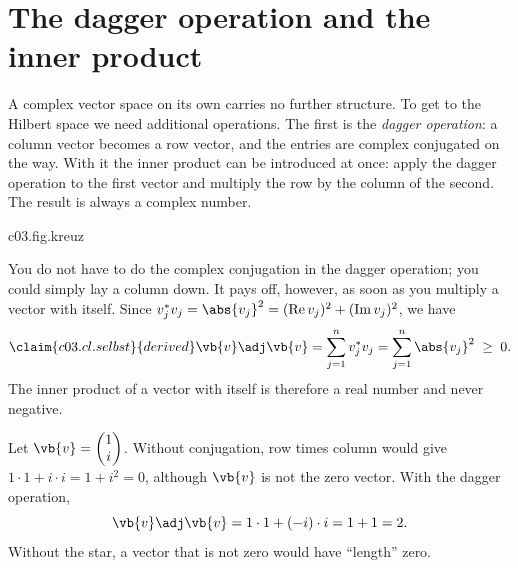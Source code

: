 \section{The dagger operation and the inner product}\label{c03.s2}

A complex vector space on its own carries no further structure. To get to the Hilbert space we
need additional operations. The first is the \emph{dagger operation}: a column vector becomes
a row vector, and the entries are complex conjugated on the way. With it the inner product can
be introduced at once: apply the dagger operation to the first vector and multiply the row by
the column of the second. The result is always a complex number.


\begin{tpcfigure}{c03.fig.kreuz}
  \caption{The dagger operation and the inner product. (a) The entries of a vector in
    $\mathbb{C}^2$ as points of the complex plane, here $v_1 = 2+i$ and $v_2 = -1+2i$ (filled).
    The dagger operation reflects every entry in the real axis (open circles,
    $v_1^* = 2-i$ and $v_2^* = -1-2i$) and lays the column down as a row. (b) The inner
    product of Example~\ref{c03.ex.skalarprodukt}: the row $\vb{v}\adj$ is multiplied entry by
    entry with the column $\vb{w}$, and the products are added.}
\end{tpcfigure}

You do not have to do the complex conjugation in the dagger operation; you could simply lay
a column down. It pays off, however, as soon as you multiply a vector with itself. Since
$v_j^* v_j = \abs{v_j}^2 = (\operatorname{Re} v_j)^2 + (\operatorname{Im} v_j)^2$, we have
\begin{equation}\label{c03.eq.selbst}\claim{c03.cl.selbst}{derived}
  \vb{v}\adj\vb{v} = \sum_{j=1}^{n} v_j^* v_j = \sum_{j=1}^{n} \abs{v_j}^2 \;\geq\; 0 .
\end{equation}
The inner product of a vector with itself is therefore a real number and never negative.

\begin{example}\label{c03.ex.ohne-stern}
  Let $\vb{v} = \begin{pmatrix} 1 \\ i \end{pmatrix}$. Without conjugation, row times column
  would give $1 \cdot 1 + i \cdot i = 1 + i^2 = 0$, although $\vb{v}$ is not the zero vector.
  With the dagger operation,
  \begin{equation}\label{c03.eq.ohne-stern}
    \vb{v}\adj\vb{v} = 1 \cdot 1 + (-i) \cdot i = 1 + 1 = 2 .
  \end{equation}
  Without the star, a vector that is not zero would have “length” zero.
\end{example}


